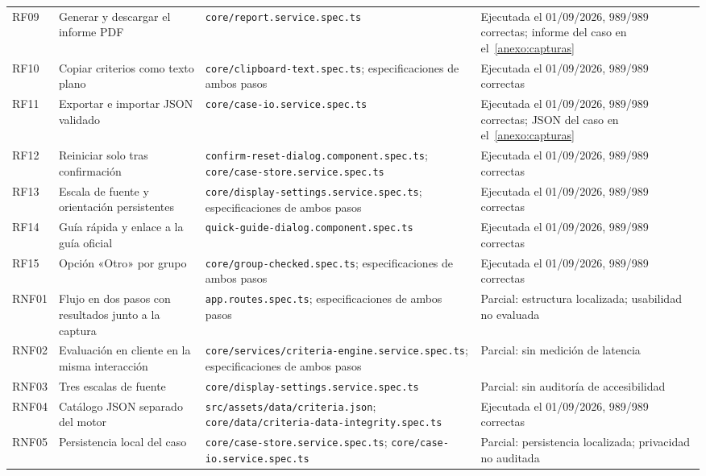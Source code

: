 {\begin{longtable}{@{}p{0.7cm}p{3.2cm}p{5.4cm}p{3.5cm}@{}}
  RF09 & Generar y descargar el informe PDF &
    \texttt{core/report.service.spec.ts} &
    Ejecutada el 01/09/2026, 989/989 correctas; informe del caso en el~\cref{anexo:capturas} \\
  RF10 & Copiar criterios como texto plano &
    \texttt{core/clipboard-text.spec.ts};
    especificaciones de ambos pasos &
    Ejecutada el 01/09/2026, 989/989 correctas \\
  RF11 & Exportar e importar JSON validado &
    \texttt{core/case-io.service.spec.ts} &
    Ejecutada el 01/09/2026, 989/989 correctas; JSON del caso en el~\cref{anexo:capturas} \\
  RF12 & Reiniciar solo tras confirmación &
    \texttt{confirm-reset-dialog.component.spec.ts};
    \texttt{core/case-store.service.spec.ts} &
    Ejecutada el 01/09/2026, 989/989 correctas \\
  RF13 & Escala de fuente y orientación persistentes &
    \texttt{core/display-settings.service.spec.ts};
    especificaciones de ambos pasos &
    Ejecutada el 01/09/2026, 989/989 correctas \\
  RF14 & Guía rápida y enlace a la guía oficial &
    \texttt{quick-guide-dialog.component.spec.ts} &
    Ejecutada el 01/09/2026, 989/989 correctas \\
  RF15 & Opción «Otro» por grupo &
    \texttt{core/group-checked.spec.ts};
    especificaciones de ambos pasos &
    Ejecutada el 01/09/2026, 989/989 correctas \\
  RNF01 & Flujo en dos pasos con resultados junto a la captura &
    \texttt{app.routes.spec.ts}; especificaciones de ambos pasos &
    Parcial: estructura localizada; usabilidad no evaluada \\
  RNF02 & Evaluación en cliente en la misma interacción &
    \texttt{core/services/criteria-engine.service.spec.ts};
    especificaciones de ambos pasos &
    Parcial: sin medición de latencia \\
  RNF03 & Tres escalas de fuente &
    \texttt{core/display-settings.service.spec.ts} &
    Parcial: sin auditoría de accesibilidad \\
  RNF04 & Catálogo JSON separado del motor &
    \texttt{src/assets/data/criteria.json};
    \texttt{core/data/criteria-data-integrity.spec.ts} &
    Ejecutada el 01/09/2026, 989/989 correctas \\
  RNF05 & Persistencia local del caso &
    \texttt{core/case-store.service.spec.ts};
    \texttt{core/case-io.service.spec.ts} &
    Parcial: persistencia localizada; privacidad no auditada \\
\end{longtable}
}

